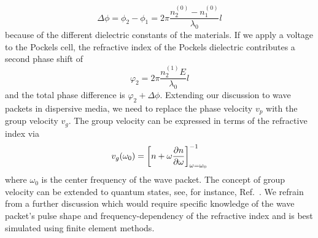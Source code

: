 \begin{equation}
	\Delta\phi
	=
	\phi_2
	-
	\phi_1
	=
	2\pi\frac{n_2^{(0)}-n_1^{(0)}}{\lambda_0}l
\end{equation}
because of the different dielectric constants of the materials.
If we apply a voltage to the Pockels cell, the refractive index of the Pockels dielectric contributes a second phase shift of
\begin{equation}
	\varphi_2
	=
	2\pi\frac{n_2^{(1)}E}{\lambda_0}l
\end{equation}
and the total phase difference is $\varphi_2+\Delta\phi$.
Extending our discussion to wave packets in dispersive media, we need to replace the phase velocity $v_p$ with the group velocity $v_g$.
The group velocity can be expressed in terms of the refractive index via~\cite[p.~211]{Jackson2007}
\begin{equation}
	v_g(\omega_0)
	=
	\left[
		n
		+
		\omega
		\pdv{n}{\omega}
	\right]^{-1}_{\omega=\omega_0}
\end{equation}
where $\omega_0$ is the center frequency of the wave packet.
The concept of group velocity can be extended to quantum states, see, for instance, Ref.~\cite[p.~3]{Naumov2013}.
We refrain from a further discussion which would require specific knowledge of the wave packet's pulse shape and frequency-dependency of the refractive index and is best simulated using finite element methods.


